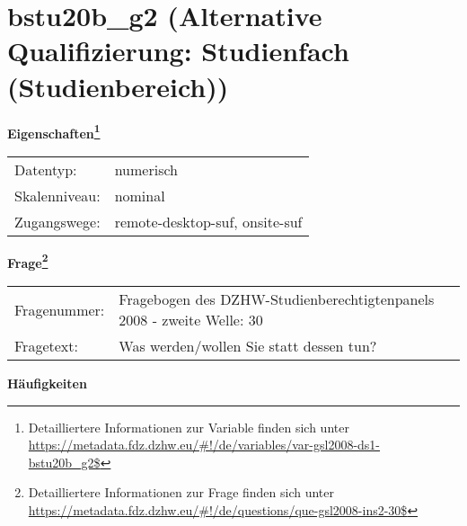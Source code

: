 
    \setcounter{footnote}{0}

    \vspace*{-1.8cm}
	\section{bstu20b\_g2 (Alternative Qualifizierung: Studienfach (Studienbereich))}
	\label{section:bstu20b_g2}



    \vspace*{0.5cm}
    \noindent\textbf{Eigenschaften\footnote{Detailliertere Informationen zur Variable finden sich unter
		\url{https://metadata.fdz.dzhw.eu/\#!/de/variables/var-gsl2008-ds1-bstu20b_g2$}}}\\
	\begin{tabularx}{\hsize}{@{}lX}
	Datentyp: & numerisch \\
	Skalenniveau: & nominal \\
	Zugangswege: &
	  remote-desktop-suf, 
	  onsite-suf
 \\
    \end{tabularx}



				\vspace*{0.5cm}
                \noindent\textbf{Frage\footnote{Detailliertere Informationen zur Frage finden sich unter
		              \url{https://metadata.fdz.dzhw.eu/\#!/de/questions/que-gsl2008-ins2-30$}}}\\
				\begin{tabularx}{\hsize}{@{}lX}
					Fragenummer: &
					  Fragebogen des DZHW-Studienberechtigtenpanels 2008 - zweite Welle:
					  30
 \\
					Fragetext: & Was werden/wollen Sie statt dessen tun? \\
				\end{tabularx}





        		\vspace*{0.5cm}
                \noindent\textbf{Häufigkeiten}

